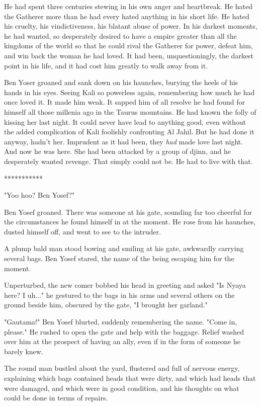 \documentclass{amsart}
\begin{document}
He had spent three centuries stewing in his own anger and heartbreak. He hated the Gatherer more than he had every hated anything in his short life. He hated his cruelty, his vindictiveness, his blatant abuse of power. In his darkest moments, he had wanted, so desperately desired to have a empire greater than all the kingdoms of the world so that he could rival the Gatherer for power, defeat him, and win back the woman he had loved. It had been, unquestioningly, the darkest point in his life, and it had cost him greatly to walk away from it. 

Ben Yoser groaned and sank down on his haunches, burying the heels of his hands in his eyes. Seeing Kali so powerless again, remembering how much he had once loved it. It made him weak. It sapped him of all resolve he had found for himself all those millenia ago in the Taurus mountains. He had known the folly of kissing her last night. It could never have lead to anything good, even without the added complication of Kali foolishly confronting Al Jahil. But he had done it anyway, hadn't her. Imprudent as it had been, they \emph{had} made love last night. And now he was here. She had been attacked by a group of djinn, and he desperately wanted revenge. That simply could not be. He had to live with that.

\begin{center}***********\end{center}

"Yoo hoo? Ben Yosef?" 

Ben Yosef groaned. There was someone at his gate, sounding far too cheerful for the circumstances he found himself in at the moment. He rose from his haunches, dusted himself off, and went to see to the intruder.

A plump bald man stood bowing and smiling at his gate, awkwardly carrying several bags. Ben Yosef stared, the name of the being escaping him for the moment.

Unperturbed, the new comer bobbed his head in greeting and asked "Is Nyaya here? I uh..." he gestured to the bags in his arms and several others on the ground beside him, obscured by the gate, "I brought her garland." 

"Gautama!" Ben Yosef blurted, suddenly remembering the name. "Come in, please." He rushed to open the gate and help with the baggage. Relief washed over him at the prospect of having an ally, even if in the form of someone he barely knew. 

The round man bustled about the yard, flustered and full of nervous energy, explaining which bags contained heads that were dirty, and which had heads that were damaged, and which were in good condition, and his thoughts on what could be done in terms of repairs. 
\end{document}
